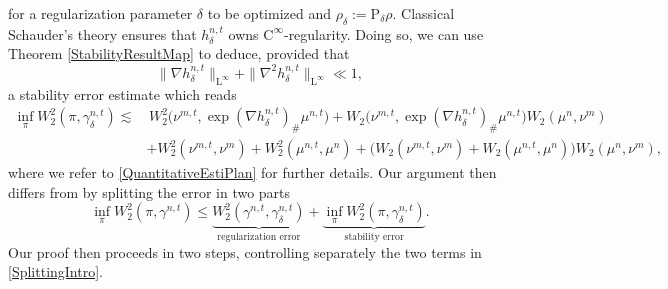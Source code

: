 \documentclass[11pt,a4paper,oneside]{amsart}
\numberwithin{equation}{section}
\newcommand{\cc}{\text{C}}
\newcommand{\LL}{\mathrm{L}}
\begin{document}
%
for a regularization parameter $\delta$ to be optimized and $\rho_\delta:=\text{P}_\delta \rho$. Classical Schauder's theory ensures that $h^{n,t}_\delta$ owns $\cc^\infty$-regularity. 
%
Doing so, we can use Theorem \ref{StabilityResultMap} to deduce, provided that 
%
\begin{equation}\label{SmallnessH}
%
\|\nabla h^{n,t}_\delta\|_{\LL^{\infty}}+\|\nabla^2 h^{n,t}_\delta\|_{\LL^\infty}\ll 1,
%
\end{equation}
%
a stability error estimate which reads
%
\begin{equation}\label{QuantitativeEstiPlanIntro}
%
\begin{aligned}
%
\inf_\pi W^2_2(\pi,\gamma^{n,t}_\delta)\lesssim&\, W^2_2\big(\nu^{m,t},\exp(\nabla h^{n,t}_\delta)_\#\mu^{n,t}\big)+W_2\big(\nu^{m,t},\exp(\nabla h^{n,t}_\delta)_\#\mu^{n,t}\big)W_2(\mu^{n},\nu^{m})\\
&+W^2_2(\nu^{m,t},\nu^{m})+W^2_2(\mu^{n,t},\mu^{n})+\big(W_2(\nu^{m,t},\nu^m)+W_2(\mu^{n,t},\mu^n)\big)W_2(\mu^n,\nu^m),
%
\end{aligned}
\end{equation}
%
where we refer to \eqref{QuantitativeEstiPlan} for further details. Our argument then differs from \cite{ambrosio2019optimal} by splitting the error in two parts
%
\begin{equation}\label{SplittingIntro}
%
\inf_\pi W^2_2(\pi,\gamma^{n,t})\leq \underbrace{W^2_2(\gamma^{n,t},\gamma^{n,t}_\delta)}_{\text{regularization error}}+\underbrace{\inf_{\pi} W^2_2(\pi,\gamma^{n,t}_\delta)}_{\text{stability error}}.
%
\end{equation}
%
Our proof then proceeds in two steps, controlling separately the two terms in \eqref{SplittingIntro}.
%
\end{document}

